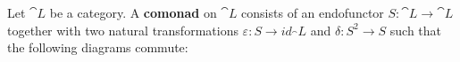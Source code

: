 \begin{definition}
  Let $\cat{L}$ be a category. A \textbf{comonad} on $\cat{L}$ consists of an endofunctor
  $S:\cat{L}\rightarrow\cat{L}$ together with two natural transformations
  $\varepsilon:S\rightarrow id_\cat{L}$ and $\delta:S^2\rightarrow S$ such that the following
  diagrams commute:
\end{definition}

